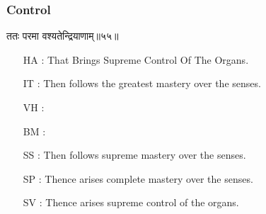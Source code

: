 \begin{frame}[fragile]\frametitle{Control}
\begin{sanskrit}
ततः परमा वश्यतेन्द्रियाणाम्॥५५॥
\end{sanskrit}

	\begin{itemize}
	\item [HA]: That Brings Supreme Control Of The Organs.
	\item [IT]: Then follows the greatest mastery over the senses.
	\item [VH]: 
	\item [BM]: 
	\item [SS]: Then follows supreme mastery over the senses.
	\item [SP]: Thence arises complete mastery over the senses.
	\item [SV]: Thence arises supreme control of the organs. 
	\end{itemize}
\end{frame}

